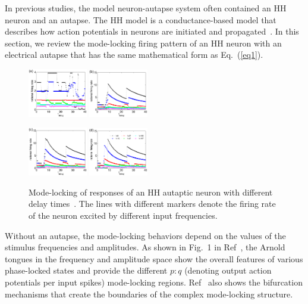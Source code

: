 \documentclass[twocolumn,showpacs,preprintnumbers,amsmath,amssymb,pre,superscriptaddress]{revtex4-1}
\begin{document}
\begin{CJK}{UTF8}{gbsn}
In previous studies, the model neuron-autapse system often contained an HH neuron and an autapse. The HH model is a conductance-based model that describes how action potentials in neurons are initiated and propagated~\cite{hodgkin}. In this section, we review the mode-locking firing pattern of an HH neuron with an electrical autapse that has the same mathematical form as Eq.~(\ref{eq1}). 

\begin{figure}
\begin{center}
\includegraphics[width=0.23\textwidth]{fig6a.eps}
\includegraphics[width=0.23\textwidth]{fig6b.eps}

\includegraphics[width=0.23\textwidth]{fig6c.eps}
\includegraphics[width=0.23\textwidth]{fig6d.eps}
\end{center}
\caption{Mode-locking of responses of an HH autaptic neuron with different delay times~\cite{wht_jtb}. The lines with different markers denote the firing rate of the neuron excited by different input frequencies. }
\label{jtb_fig1}
\end{figure}

Without an autapse, the mode-locking behaviors depend on the values of the stimulus frequencies and amplitudes. As shown in Fig.~1 in Ref~\cite{wht_jtb}, the Arnold tongues in the frequency and amplitude space show the overall features of various phase-locked states and provide the different $p:q$ (denoting output action potentials per input spikes) mode-locking regions. Ref~\cite{leesg} also shows the bifurcation mechanisms that create the boundaries of the complex mode-locking structure. 


\end{CJK}
\end{document}
